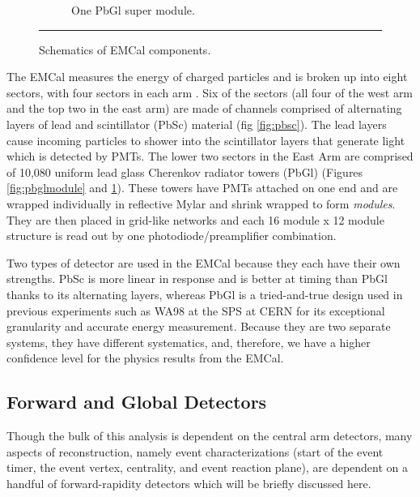 \begin{figure}
\begin{subfigure}[b]{0.6\textwidth}
    \caption{One PbGl super module.}
\label{fig:pbglsupmodule}
\end{subfigure}
\rule{35em}{0.5pt}
\caption[Schematics of EMCal components.]{Schematics of EMCal components.}
\label{fig:EMCalcomponents}
\end{figure}
\dsp

The EMCal measures the energy of charged particles and is broken up into eight sectors, with four sectors in each arm \citep{EMCfocus}. Six of the sectors (all four of the west arm and the top two in the east arm) are made of channels comprised of alternating layers of lead and scintillator (PbSc) material (fig \ref{fig:pbsc}). The lead layers cause incoming particles to shower into the scintillator layers that generate light which is detected by PMTs. The lower two sectors in the East Arm are comprised of 10,080 uniform lead glass Cherenkov radiator towers (PbGl) (Figures \ref{fig:pbglmodule} and \ref{fig:pbglsupmodule}). These towers have PMTs attached on one end and are wrapped individually in reflective Mylar and shrink wrapped to form \textit{modules}. They are then placed in grid-like networks and each 16 module x 12 module structure is read out by one photodiode/preamplifier combination. 

Two types of detector are used in the EMCal because they each have their own strengths. PbSc is more linear in response and is better at timing than PbGl thanks to its alternating layers, whereas PbGl is a tried-and-true design used in previous experiments such as WA98 at the SPS at CERN for its exceptional granularity and accurate energy measurement. Because they are two separate systems, they have different systematics, and, therefore, we have a higher confidence level for the physics results from the EMCal. 


\subsection{Forward and Global Detectors}
Though the bulk of this analysis is dependent on the central arm detectors, many aspects of reconstruction, namely event characterizations (start of the event timer, the event vertex, centrality, and event reaction plane), are dependent on a handful of forward-rapidity detectors which will be briefly discussed here.

